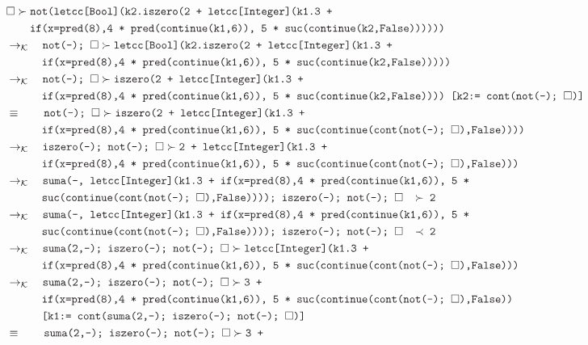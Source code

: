 \documentclass{article}
\newcommand{\tx}[1]{\textcolor{Black} {\texttt{#1}}}
\newcommand{\es}{$\square$}
\newcommand{\pop}[2]{ \tx{#1} \succ \tx{#2}}
\newcommand{\kr}{\rightarrow_{\mathcal{K}} \quad}
\begin{document}
\begin{enumerate}
\begin{enumerate}
			\begin{align*}
			&\pop{\es}{not(letcc[Bool](k2.iszero(2 + letcc[Integer](k1.3 +} \\
			&\tx{\quad \quad  if(x=pred(8),4 * pred(continue(k1,6)), 5 * suc(continue(k2,False))))))}\\
			&\kr \pop{not(-); \es}{letcc[Bool](k2.iszero(2 + letcc[Integer](k1.3 +} \\
			&\tx{\quad \quad \quad if(x=pred(8),4 * pred(continue(k1,6)), 5 * suc(continue(k2,False)))))}\\
			&\kr \pop{not(-); \es}{iszero(2 + letcc[Integer](k1.3 +} \\
			&\tx{\quad \quad \quad if(x=pred(8),4 * pred(continue(k1,6)), 5 * suc(continue(k2,False)))) [k2:= cont(not(-); \es)]}\\
			&\equiv \quad \quad \pop{not(-); \es}{iszero(2 + letcc[Integer](k1.3 +} \\
			&\tx{\quad \quad \quad if(x=pred(8),4 * pred(continue(k1,6)), 5 * suc(continue(cont(not(-); \es),False))))}\\		
			&\kr \pop{iszero(-); not(-); \es}{2 + letcc[Integer](k1.3 +} \\
			&\tx{\quad \quad \quad if(x=pred(8),4 * pred(continue(k1,6)), 5 * suc(continue(cont(not(-); \es),False)))}\\
			&\kr \tx{suma(-, letcc[Integer](k1.3 + if(x=pred(8),4 * pred(continue(k1,6)), 5 *}\\ &\tx{\quad \quad \quad suc(continue(cont(not(-); \es),False)))); iszero(-); not(-); \es $\quad \succ$ 2}\\
			&\kr \tx{suma(-, letcc[Integer](k1.3 + if(x=pred(8),4 * pred(continue(k1,6)), 5 *}\\ &\tx{\quad \quad \quad suc(continue(cont(not(-); \es),False)))); iszero(-); not(-); \es $\quad \prec$ 2}\\
			&\kr \pop{suma(2,-); iszero(-); not(-); \es}{letcc[Integer](k1.3 +}\\
			&\tx{\quad \quad \quad if(x=pred(8),4 * pred(continue(k1,6)), 5 * suc(continue(cont(not(-); \es),False)))}\\
			&\kr \pop{suma(2,-); iszero(-); not(-); \es}{3 +}\\
			&\tx{\quad \quad \quad if(x=pred(8),4 * pred(continue(k1,6)), 5 * suc(continue(cont(not(-); \es),False))}\\
			&\tx{\quad \quad \quad [k1:= cont(suma(2,-); iszero(-); not(-); \es)]}\\
			& \equiv \quad \quad \pop{suma(2,-); iszero(-); not(-); \es}{3 +}\\

\end{align*}
\end{enumerate}
\end{enumerate}
\end{document}
